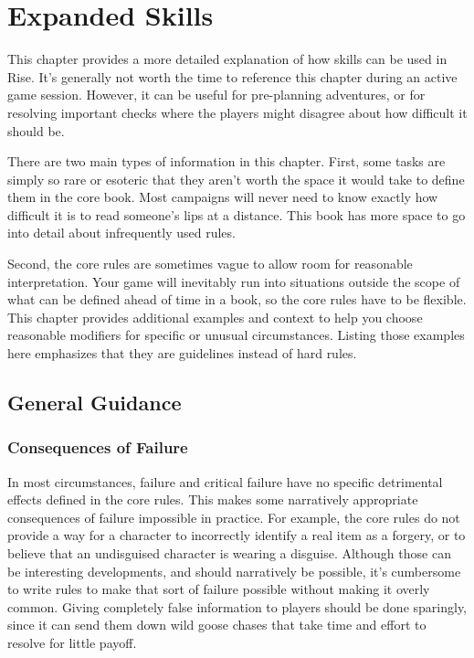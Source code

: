 \chapter{Expanded Skills}

This chapter provides a more detailed explanation of how skills can be used in Rise.
It's generally not worth the time to reference this chapter during an active game session.
However, it can be useful for pre-planning adventures, or for resolving important checks where the players might disagree about how difficult it should be.

There are two main types of information in this chapter.
First, some tasks are simply so rare or esoteric that they aren't worth the space it would take to define them in the core book.
Most campaigns will never need to know exactly how difficult it is to read someone's lips at a distance.
This book has more space to go into detail about infrequently used rules.

Second, the core rules are sometimes vague to allow room for reasonable interpretation.
Your game will inevitably run into situations outside the scope of what can be defined ahead of time in a book, so the core rules have to be flexible.
This chapter provides additional examples and context to help you choose reasonable modifiers for specific or unusual circumstances.
Listing those examples here emphasizes that they are guidelines instead of hard rules.

\section{General Guidance}

    \subsection{Consequences of Failure}
        In most circumstances, failure and critical failure have no specific detrimental effects defined in the core rules.
        This makes some narratively appropriate consequences of failure impossible in practice.
        For example, the core rules do not provide a way for a character to incorrectly identify a real item as a forgery, or to believe that an undisguised character is wearing a disguise.
        Although those can be interesting developments, and should narratively be possible, it's cumbersome to write rules to make that sort of failure possible without making it overly common.
        Giving completely false information to players should be done sparingly, since it can send them down wild goose chases that take time and effort to resolve for little payoff.

